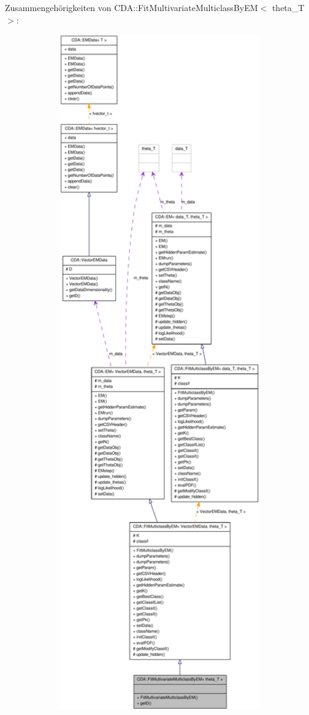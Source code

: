 Zusammengehörigkeiten von CDA::FitMultivariateMulticlassByEM$<$ theta\_\-T $>$:\nopagebreak
\begin{figure}[H]
\begin{center}
\leavevmode
\includegraphics[width=400pt]{classCDA_1_1FitMultivariateMulticlassByEM__coll__graph}
\end{center}
\end{figure}

